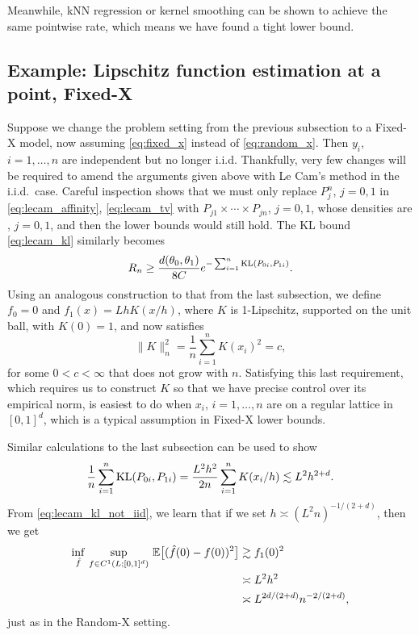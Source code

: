 \documentclass{article}
\begin{document}
Meanwhile, kNN regression or kernel smoothing can be shown to achieve the same
pointwise rate, which means we have found a tight lower bound.

\subsection{Example: Lipschitz function estimation at a point, Fixed-X} 

Suppose we change the problem setting from the previous subsection to a Fixed-X
model, now assuming \eqref{eq:fixed_x} instead of \eqref{eq:random_x}. Then
$y_i$, $i=1,\dots,n$ are independent but no longer i.i.d. Thankfully, very few
changes will be required to amend the arguments given above with Le Cam's method
in the i.i.d.\ case. Careful inspection shows that we must only replace $P_j^n$,
$j=0,1$ in \eqref{eq:lecam_affinity}, \eqref{eq:lecam_tv} with $P_{j1} \times
\cdots \times P_{jn}$, $j=0,1$, whose densities are , $j=0,1$, and then the
lower bounds would still hold. The KL bound \eqref{eq:lecam_kl} similarly 
becomes 
\begin{equation}
\label{eq:lecam_kl_not_iid}
R_n \geq \frac{d(\theta_0,\theta_1)}{8C} e^{-\sum_{i=1}^n \mathrm{KL}(P_{0i}, P_{1i})}. 
\end{equation}
Using an analogous construction to that from the last subsection, we define 
$f_0=0$ and $f_1(x) = Lh K(x/h)$, where $K$ is 1-Lipschitz, supported on the
unit ball, with $K(0)=1$, and now satisfies  
\[
\|K\|_n^2 = \frac{1}{n} \sum_{i=1}^n K(x_i)^2 = c,
\]
for some $0 < c < \infty$ that does not grow with $n$. Satisfying this last
requirement, which requires us to construct $K$ so that we have precise control
over its empirical norm, is easiest to do when $x_i$, $i=1,\dots,n$ are on a
regular lattice in $[0,1]^d$, which is a typical assumption in Fixed-X lower
bounds. 

Similar calculations to the last subsection can be used to show 
\[
\frac{1}{n} \sum_{i=1}^n \mathrm{KL}(P_{0i}, P_{1i}) = \frac{L^2 h^2}{2n}
\sum_{i=1}^n K(x_i/h) \lesssim L^2 h^{2+d}.
\]
From \eqref{eq:lecam_kl_not_iid}, we learn that if we set $h \asymp (L^2
n)^{-1/(2+d)}$, then we get
\begin{align*}
\inf_{\hat{f}} \, \sup_{f \in C^1(L; [0,1]^d)} \, \mathbb{E}\big[ (\hat{f}(0) - f(0))^2 \big] 
& \gtrsim f_1(0)^2 \\
&\asymp L^2 h^2 \\
&\asymp L^{2d/(2+d)} n^{-2/(2+d)}, 
\end{align*}
just as in the Random-X setting.
\end{document}
